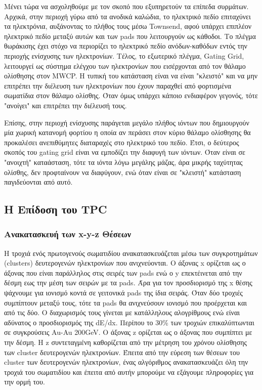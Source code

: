 	Μένει τώρα να ασχοληθούμε με τον σκοπό που εξυπηρετούν τα επίπεδα συρμάτων. 
Αρχικά, στην περιοχή γύρω από τα ανοδικά καλώδια, το ηλεκτρικό πεδίο επιταχύνει τα ηλεκτρόνια, αυξάνοντας το πλήθος τους μέσω Townsend, αφού υπάρχει επιπλέον ηλεκτρικό πεδίο μεταξύ αυτών και των pads που λειτουργούν ως κάθοδοι.
	Το πλέγμα θωράκισης έχει στόχο να περιορίζει το ηλεκτρικό πεδίο ανόδων-καθόδων εντός την περιοχής ενίσχυσης των ηλεκτρονίων. 
	Τέλος, το εξωτερικό πλέγμα, Gating Grid, λειτουργεί ως σύστημα ελέγχου των ηλεκτρονίων που εισέρχονται από τον θάλαμο ολίσθησης στον MWCP. Η τυπική του κατάσταση είναι να είναι "κλειστό" και να μην επιτρέπει την διέλευση των ηλεκτρονίων που έχουν παραχθεί από φορτισμένα σωματίδια στον θάλαμο ολίσθης.  Όταν όμως υπάρχει κάποιο ενδιαφέρον γεγονός, τότε "ανοίγει" και επιτρέπει την διέλευσή τους.
	
	Επίσης, στην περιοχή ενίσχυσης παράγεται μεγάλο πλήθος ιόντων που δημιουργούν μία χωρική κατανομή φορτίου η οποία αν περάσει στον κύριο θάλαμο ολίσθησης θα προκαλέσει ανεπιθύμητες διαταραχές στο ηλεκτρικό του πεδίο.  Έτσι,
ο δεύτερος σκοπός του gating grid είναι να εμποδίζει την διαφυγή των ιόντων. Όταν είναι σε "ανοιχτή" καταάσταση, τότε τα ιόντα λόγω μεγάλης μάζας, άρα μικρής ταχύτητας ολίσθης, δεν προφταίνουν να διαφύγουν, ενώ όταν είναι σε "κλειστή" κατάσταση παγιδεύονται από αυτό.
\vspace{-0.1cm}
\subsection{Η Επίδοση του TPC}
\subsubsection{Ανακατασκευή των x-y-z Θέσεων}
	H τροχιά ενός πρωτογενούς σωματιδίου ανακατασκευάζεται μέσω των συγκροτημάτων (clusters) δευτερογενών ηλεκτρονίων που ανιχνεύονται. Ο άξονας x ορίζεται ως ο άξονας που είναι παράλληλος στις σειρές των pads ενώ ο y επεκτέινεται από την δέσμη εως την μέση των σειρών με τα pads.
	Άρα για τον προσδιορισμό της x θέσης ψάχνουμε για ιονισμό κοντά σε γειτονικά pads της ίδια σειράς. Όταν δύο τροχιές συμπίπτουν μεταξύ τους, τότε τα pads θα ανιχνεύσουν ιονισμό που προέρχεται και από τις δύο. Ο διαχωρισμός τους γίνεται με κατάλληλους αλογρίθμους ενώ είναι αδύνατος ο προσδιορισμός της dE/dx. Περίπου το 30\% των τροχιών επικαλύπτωνται σε συγκρούσεις Au-Au 200GeV.
	Ο άξονας z ορίζεται ως ο άξονας που συμπίπτει με την δέσμη. Η z συντεταγμένη καθορίζεται από την μέτρηση του χρόνου ολίσθησης των cluster δευτερογενών ηλεκτρονίων. 
	Έπειτα από την εύρεση των θέσεων του cluster των δευτερογενών ηλεκτρονίων, ένας αλγόριθμος ανακατασκευάζει όλη την τροχιά του σωματιδίου και έπειτα από αυτήν μπορούμε να εξάγουμε πληροφορίες για την ορμή του.

